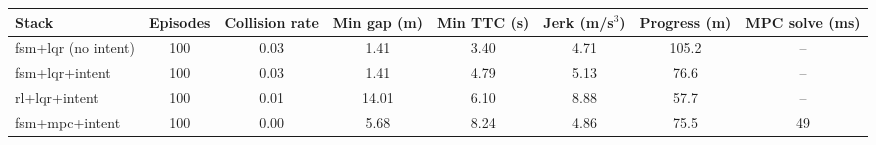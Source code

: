 \begin{tabular}{@{}lccccccc@{}}
\toprule
Stack & Episodes & Collision rate & Min gap (m) & Min TTC (s) & Jerk (m/s$^3$) & Progress (m) & MPC solve (ms) \\
\midrule
fsm+lqr (no intent) & 100 & 0.03 & 1.41 & 3.40 & 4.71 & 105.2 & -- \\
fsm+lqr+intent & 100 & 0.03 & 1.41 & 4.79 & 5.13 & 76.6 & -- \\
rl+lqr+intent & 100 & 0.01 & 14.01 & 6.10 & 8.88 & 57.7 & -- \\
fsm+mpc+intent & 100 & 0.00 & 5.68 & 8.24 & 4.86 & 75.5 & 49 \\
\bottomrule
\end{tabular}
